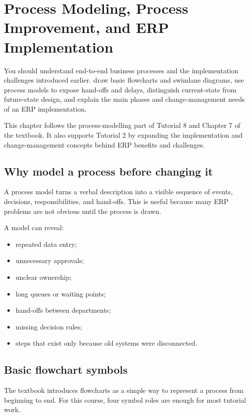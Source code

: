 \chapter{Process Modeling, Process Improvement, and ERP Implementation}
\label{ch:process-modeling}

\chapterguide
  {You should understand end-to-end business processes and the implementation challenges introduced earlier.}
  {draw basic flowcharts and swimlane diagrams, use process models to expose hand-offs and delays, distinguish current-state from future-state design, and explain the main phases and change-management needs of an ERP implementation.}

\begin{sourcebasis}
This chapter follows the process-modelling part of Tutorial 8 and Chapter 7 of the textbook. It also supports Tutorial 2 by expanding the implementation and change-management concepts behind ERP benefits and challenges.
\end{sourcebasis}

\section{Why model a process before changing it}

A process model turns a verbal description into a visible sequence of events, decisions, responsibilities, and hand-offs. This is useful because many ERP problems are not obvious until the process is drawn.

A model can reveal:

\begin{itemize}
  \item repeated data entry;
  \item unnecessary approvals;
  \item unclear ownership;
  \item long queues or waiting points;
  \item hand-offs between departments;
  \item missing decision rules;
  \item steps that exist only because old systems were disconnected.
\end{itemize}

\section{Basic flowchart symbols}

The textbook introduces flowcharts as a simple way to represent a process from beginning to end. For this course, four symbol roles are enough for most tutorial work.

